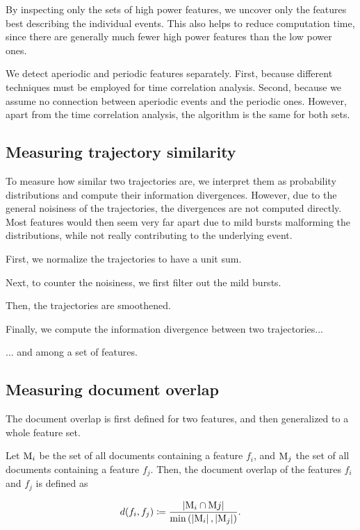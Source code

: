 By inspecting only the sets of high power features, we uncover only the features best describing the individual events. This also helps to reduce computation time, since there are generally much fewer high power features than the low power ones.

We detect aperiodic and periodic features separately. First, because different techniques must be employed for time correlation analysis. Second, because we assume no connection between aperiodic events and the periodic ones. However, apart from the time correlation analysis, the algorithm is the same for both sets.

\subsection{Measuring trajectory similarity}
To measure how similar two trajectories are, we interpret them as probability distributions and compute their information divergences. However, due to the general noisiness of the trajectories, the divergences are not computed directly. Most features would then seem very far apart due to mild bursts malforming the distributions, while not really contributing to the underlying event.

First, we normalize the trajectories to have a unit sum.

Next, to counter the noisiness, we first filter out the mild bursts.

Then, the trajectories are smoothened.

Finally, we compute the information divergence between two trajectories...

... and among a set of features.

\subsection{Measuring document overlap}
The document overlap is first defined for two features, and then generalized to a whole feature set.

Let $\text{M}_{i}$ be the set of all documents containing a feature $f_{i}$, and $\text{M}_{j}$ the set of all documents containing a feature $f_{j}$. Then, the document overlap of the features $f_{i}$ and $f_{j}$ is defined as

\begin{equation}
	d(f_{i}, f_{j}) \coloneqq \frac{\left\vert{\text{M}_{i} \cap \text{M}{j}}\right\vert}{\min \left( {\left\vert{\text{M}_{i}}\right\vert, \left\vert{\text{M}_{j}}\right\vert} \right)}.
\end{equation}

